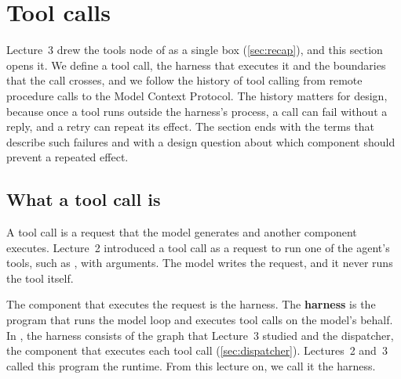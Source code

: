 \section{Tool calls}
\label{sec:toolcalls}

Lecture~3 drew the tools node of \msa{} as a single box (\cref{sec:recap}), and this section opens
it. We define a tool call, the harness that executes it and the boundaries that the call crosses, and
we follow the history of tool calling from remote procedure calls to the Model Context Protocol. The
history matters for design, because once a tool runs outside the harness's process, a call can fail
without a reply, and a retry can repeat its effect. The section ends with the terms that describe
such failures and with a design question about which component should prevent a repeated effect.

\subsection{What a tool call is}
\label{sec:toolcalls-what}

A tool call is a request that the model generates and another component executes. Lecture~2
introduced a tool call as a request to run one of the agent's tools, such as ,
with arguments. The model writes the request, and it never runs the tool itself.

The component that executes the request is the harness. The \textbf{harness} is the program that
runs the model loop and executes tool calls on the model's behalf. In \msa{}, the harness consists
of the graph that Lecture~3 studied and the dispatcher, the component that executes each tool call
(\cref{sec:dispatcher}). Lectures~2 and~3 called this program the runtime. From this lecture on, we
call it the harness.

